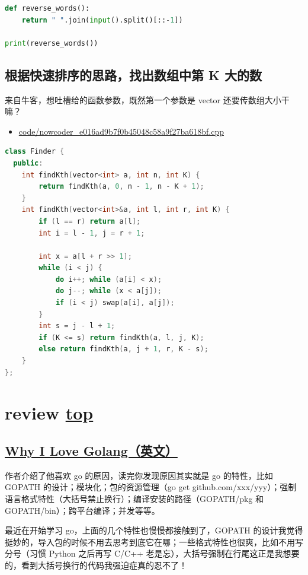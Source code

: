 \begin{lstlisting}[language=Python]
def reverse_words():
    return " ".join(input().split()[::-1])

print(reverse_words())
\end{lstlisting}

\subsection{根据快速排序的思路，找出数组中第 K 大的数}

来自牛客，想吐槽给的函数参数，既然第一个参数是 vector 还要传数组大小干嘛？

\begin{itemize}
  \item \href{https://github.com/taseikyo/arts/blob/master/code/nowcoder_e016ad9b7f0b45048c58a9f27ba618bf.cpp}{code/nowcoder\_e016ad9b7f0b45048c58a9f27ba618bf.cpp}
\end{itemize}

\begin{lstlisting}[language=C++]
class Finder {
  public:
	int findKth(vector<int> a, int n, int K) {
		return findKth(a, 0, n - 1, n - K + 1);
	}
	int findKth(vector<int>&a, int l, int r, int K) {
		if (l == r) return a[l];
		int i = l - 1, j = r + 1;

		int x = a[l + r >> 1];
		while (i < j) {
			do i++; while (a[i] < x);
			do j--; while (x < a[j]);
			if (i < j) swap(a[i], a[j]);
		}
		int s = j - l + 1;
		if (K <= s) return findKth(a, l, j, K);
		else return findKth(a, j + 1, r, K - s);
	}
};
\end{lstlisting}

\section{review \hyperref[chap:w2]{top}}\label{w2:review}

\subsection{\href{https://medium.com/@saginadir/why-i-love-golang-90085898b4f7}{Why I Love Golang（英文）}}

作者介绍了他喜欢 go 的原因，读完你发现原因其实就是 go 的特性，比如 GOPATH 的设计；模块化；包的资源管理（go get github.com/xxx/yyy）；强制语言格式特性（大括号禁止换行）；编译安装的路径（GOPATH/pkg 和 GOPATH/bin）；跨平台编译；并发等等。

最近在开始学习 go，上面的几个特性也慢慢都接触到了，GOPATH 的设计我觉得挺妙的，导入包的时候不用去思考到底它在哪；一些格式特性也很爽，比如不用写分号（习惯 Python 之后再写 C/C++ 老是忘），大括号强制在行尾这正是我想要的，看到大括号换行的代码我强迫症真的忍不了！

